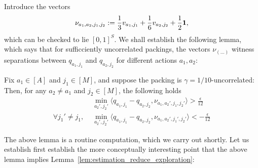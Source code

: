 Introduce the vectors 
\begin{align*}
\nu_{a_1,a_2,j_1,j_2} := \frac{1}{3}v_{a_1,j_1} + \frac{1}{6}v_{a_2,j_2} + \frac{1}{2}\mathbf{1},
\end{align*}
which can be checked to lie $[0,1]^S$. We shall establish the following lemma, which says that for sufficciently uncorrelated packings, the vectors $\nu_{(\dots)}$ witness separations between $q_{a_1,j_1}$ and $q_{a_2,j_2}$ for different actions $a_1,a_2$:
\begin{lemma}\label{lemma:inner_product_lem} Fix $a_1 \in [A]$ and $j_1 \in [M]$, and suppose the packing is $\gamma = 1/10$-uncorrelated: Then, for any $a_2 \ne a_1$ and $j_2 \in [M]$, the following holds
\begin{align*}
&\min_{a_2',j_2'}\langle q_{a_1,j_1} - q_{a_2,j_2}, \nu_{a_1,a_2',j_1,j_2'} \rangle >  \frac{\epsilon}{12}\\
\forall j_1' \ne j_1,\,\, & \min_{a_2',j_2'}\langle q_{a_1,j_1} - q_{a_2,j_2}, \nu_{a_1,a_2',j_1',j_2'} \rangle <  - \frac{\epsilon}{12}
\end{align*}
\end{lemma}
The above lemma is a routine computation, which we carry out shortly. Let us establish first establish the more conceptually interesting point that the above lemma implies Lemma~\ref{lem:estimation_reduce_exploration}:

